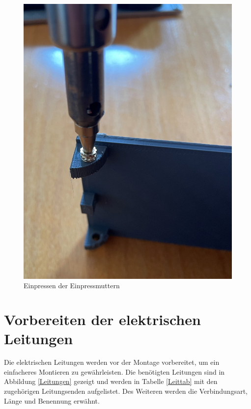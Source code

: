 \begin{figure}[H]
	\begin{center}
		\includegraphics[width=\textwidth]{Images/Einpress.jpg}
		\caption{Einpressen der Einpressmuttern} \label{Einpress}
	\end{center}
\end{figure}

\section{Vorbereiten der elektrischen Leitungen}
Die elektrischen Leitungen werden vor der Montage vorbereitet, um ein einfacheres Montieren zu gewährleisten. Die benötigten Leitungen sind in Abbildung \ref{Leitungen} gezeigt und werden in Tabelle \ref{Leittab} mit den zugehörigen Leitungsenden aufgelistet. Des Weiteren werden die Verbindungsart, Länge und Benennung erwähnt.

